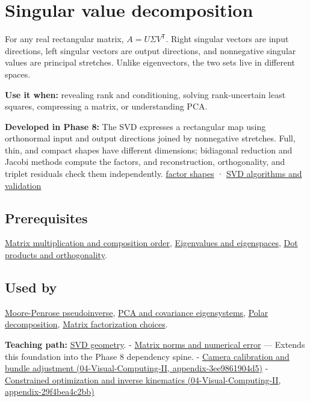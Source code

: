 \hypertarget{appendix-1fad5e7f36fa}{}
\section{Singular value decomposition}\label{appendix-1fad5e7f36fa-singular-value-decomposition}

For any real rectangular matrix, \(A=U\Sigma V^\mathsf T\). Right singular vectors are input directions, left singular vectors are output directions, and nonnegative singular values are principal stretches. Unlike eigenvectors, the two sets live in different spaces.

\textbf{Use it when:} revealing rank and conditioning, solving rank-uncertain least squares, compressing a matrix, or understanding PCA.

\textbf{Developed in Phase 8:} The SVD expresses a rectangular map using orthonormal input and output directions joined by nonnegative stretches. Full, thin, and compact shapes have different dimensions; bidiagonal reduction and Jacobi methods compute the factors, and reconstruction, orthogonality, and triplet residuals check them independently. \hyperref[02-foundations-ii-ch024-full-thin-and-compact-shapes-for-tall-and-wide-matrices]{factor shapes} · \hyperref[02-foundations-ii-ch024-how-numerical-software-computes-and-checks-an-svd]{SVD algorithms and validation}

\subsection{Prerequisites}\label{appendix-1fad5e7f36fa-prerequisites}

\hyperref[appendix-ab31ef447dbf]{Matrix multiplication and composition order}, \hyperref[appendix-0b3be18411f9]{Eigenvalues and eigenspaces}, \hyperref[appendix-8bc4e8fc547c]{Dot products and orthogonality}.

\subsection{Used by}\label{appendix-1fad5e7f36fa-used-by}

\hyperref[appendix-541306fdbc1b]{Moore-Penrose pseudoinverse}, \hyperref[appendix-ad175ef3c5bf]{PCA and covariance eigensystems}, \hyperref[appendix-73f5bcf7a462]{Polar decomposition}, \hyperref[appendix-221a483bec2d]{Matrix factorization choices}.

\textbf{Teaching path:} \hyperref[02-foundations-ii-ch024-singular-value-decomposition-covers-every-rectangular-map]{SVD geometry}. - \hyperref[appendix-f8657bac66e5]{Matrix norms and numerical error} --- Extends this foundation into the Phase 8 dependency spine. - \href{../04-Visual-Computing-II/main.pdf\#nameddest=appendix-3ee9861904d5}{Camera calibration and bundle adjustment (04-Visual-Computing-II, appendix-3ee9861904d5)} - \href{../04-Visual-Computing-II/main.pdf\#nameddest=appendix-29f4bea4c2bb}{Constrained optimization and inverse kinematics (04-Visual-Computing-II, appendix-29f4bea4c2bb)}

